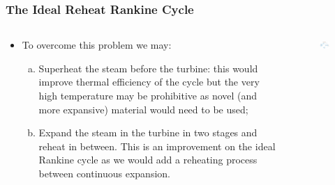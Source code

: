 \documentclass[10pt,compress,handout,ignorenonframetext]{beamer}
\begin{document}
\begin{frame}
 \frametitle{The Ideal Reheat Rankine Cycle}
  \begin{columns}
   \begin{column}[c]{0.5\linewidth}

 \begin{itemize} %
  \item <1-> To overcome this problem we may:
  \begin{enumerate}[(a)] %
   \item <2-> Superheat the steam before the turbine: this would improve thermal efficiency of the cycle but the very high temperature may be prohibitive as novel (and more expansive) material would need to be used;
   \item <3-> Expand the steam in the turbine in two stages and reheat in between. This is an improvement on the ideal Rankine cycle as we would add a reheating process between continuous expansion.
  \end{enumerate} 
 \end{itemize}
   \end{column}

   \begin{column}[c]{0.5\linewidth} 
    \begin{figure}%
     \begin{center}
      \includegraphics[width=6.25cm,clip]{./Pics/Reheat_Rankine_Cycle}
     \end{center}
    \end{figure}  
   \end{column}
  \end{columns}
 \normalsize
\end{frame}
\end{document}
